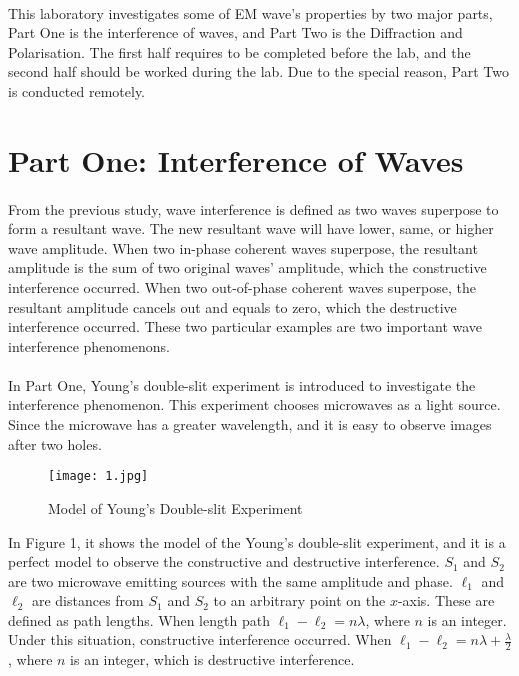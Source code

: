 \documentclass[12pt]{article}
\begin{document}
    \paragraph{}
    This laboratory investigates some of EM wave's properties by two major parts, Part One is the interference of waves, and Part Two is the Diffraction and Polarisation. The first half requires to be completed before the lab, and the second half should be worked during the lab. Due to the special reason, Part Two is conducted remotely.
    
    
    
    
    
    \section{Part One: Interference of Waves}
    \paragraph{}
    From the previous study, wave interference is defined as two waves superpose to form a resultant wave\cite{2}. The new resultant wave will have lower, same, or higher wave amplitude. When two in-phase coherent waves superpose, the resultant amplitude is the sum of two original waves' amplitude, which the constructive interference occurred. When two out-of-phase coherent waves superpose, the resultant amplitude cancels out and equals to zero, which the destructive interference occurred. These two particular examples are two important wave interference phenomenons.
    
    \paragraph{}
    In Part One, Young's double-slit experiment is introduced to investigate the interference phenomenon. This experiment chooses microwaves as a light source. Since the microwave has a  greater wavelength, and it is easy to observe images after two holes.
    \begin{figure}[H]
    \centering
    \texttt{[image: 1.jpg]}
    \caption{Model of Young's Double-slit Experiment\cite{3}}
    \end{figure}
    In Figure 1, it shows the model of the Young's double-slit experiment, and it is a perfect model to observe the constructive and destructive interference. $S_{1}$ and $S_{2}$ are two microwave emitting sources with the same amplitude and phase. $\ell_{1}$ and $\ell_{2}$ are distances from $S_{1}$ and $S_{2}$ to an arbitrary point on the $x$-axis. These are defined as path lengths. When length path $\ell_{1}-\ell_{2}=n\lambda$, where $n$ is an integer. Under this situation, constructive interference occurred. When $\ell_{1}-\ell_{2}=n\lambda+\frac{\lambda}{2}$, where $n$ is an integer, which is destructive interference. 
    
\end{document}
